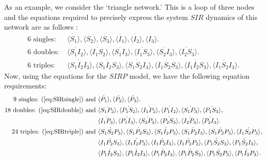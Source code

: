 \documentclass[12pt,a4paper]{article}
\begin{document}
As an example, we consider the `triangle network.' This is a loop of three nodes and the equations required to precisely express the system $SIR$ dynamics of this network are as follows \cite{kiss15}:
\begin{align}
\text{6 singles: } & \dot{\langle S_1 \rangle}, \dot{\langle S_2 \rangle}, \dot{\langle S_3 \rangle}, \dot{\langle I_1 \rangle}, \dot{\langle I_2 \rangle}, \dot{\langle I_3 \rangle}.\label{eq:SIRsingle}\\
\text{6 doubles: } & \dot{\langle S_1 I_2 \rangle},\dot{\langle I_1 S_2 \rangle}, \dot{\langle S_1 I_3 \rangle}, \dot{\langle I_1 S_3 \rangle}, \dot{\langle S_2 I_3\rangle}, \dot{\langle I_2 S_3 \rangle}.\label{eq:SIRdouble}\\
\text{6 triples: } & \dot{\langle S_1 I_2 I_3 \rangle}, \dot{\langle S_1 I_2 S_3 \rangle}, \dot{\langle S_1 S_2 I_3 \rangle}, \dot{\langle I_1 S_2 S_3 \rangle}, \dot{\langle I_1 I_2 S_3 \rangle}, \dot{\langle I_1 S_2 I_3 \rangle}. \label{eq:SIRtriple}
\end{align}
Now, using the equations for the $SIRP$ model, we have the following equation requirements:
\begin{align*}
\text{9 singles: (} \ref{eq:SIRsingle} \text{) and } & \dot{\langle P_1 \rangle}, \dot{\langle P_2 \rangle}, \dot{\langle P_3 \rangle}.\\
\text{18 doubles: (} \ref{eq:SIRdouble} \text{) and }& \dot{\langle S_1 P_2 \rangle},\dot{\langle P_1 S_2 \rangle}, \dot{\langle I_1 P_2 \rangle}, \dot{\langle P_1 I_2 \rangle}, \dot{\langle S_1 P_3\rangle}, \dot{\langle P_1 S_3 \rangle},\\ & \dot{\langle I_1 P_3 \rangle}, \dot{\langle P_1 I_3 \rangle}, \dot{\langle S_2 P_3 \rangle}, \dot{\langle P_2 S_3 \rangle}, \dot{\langle I_2 P_3 \rangle}, \dot{\langle P_2 I_3 \rangle}. \\
\text{24 triples: (} \ref{eq:SIRtriple} \text{) and } & \dot{\langle S_1 S_2 P_3 \rangle}, \dot{\langle S_1 P_2 S_3 \rangle}, \dot{\langle S_1 I_2 P_3\rangle}, \dot{\langle S_1 P_2 I_3 \rangle}, \dot{\langle S_1 P_2 P_3\rangle}, \dot{\langle I_1 S_2 P_3 \rangle},\\
&  \dot{\langle I_1 P_2 S_3 \rangle}, \dot{\langle I_1 I_2 P_3 \rangle}, \dot{\langle I_1 P_2 I_3 \rangle}, \dot{\langle I_1 P_2 P_2 \rangle},  \dot{\langle P_1 S_2 S_3 \rangle}, \dot{\langle P_1 S_2 I_3 \rangle},\\
&  \dot{\langle P_1 I_2 S_3 \rangle}, \dot{\langle P_1 I_2 I_3 \rangle}, \dot{\langle P_1 P_2 I_3 \rangle},  \dot{\langle P_1 P_2 S_3 \rangle}, \dot{\langle P_1 S_2 P_3 \rangle},  \dot{\langle P_1 I_2 P_3\rangle}.
\end{align*}
\end{document}
